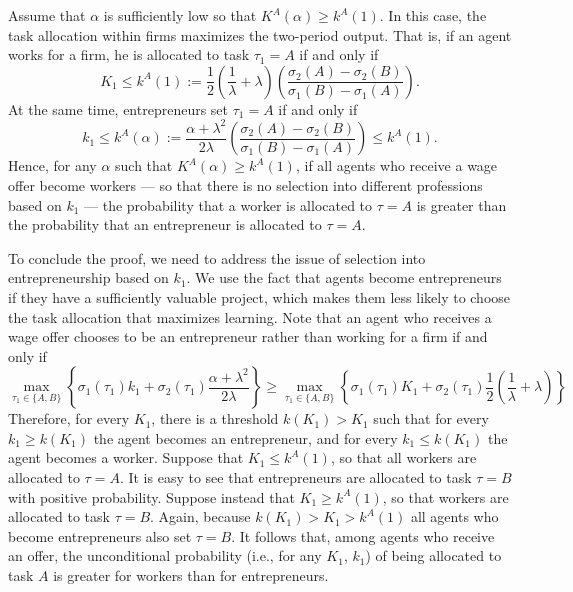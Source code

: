 \documentclass[12pt,american]{paper}
\theoremstyle{remark}
\begin{document}

Assume that $\alpha$ is sufficiently low so that $K^A(\alpha)\geq k^A(1)$. In this case, the task allocation within firms maximizes the two-period output. That is,  if an agent works for a firm, he is allocated to task $\tau_1=A$ if and only if
$$
K_1 \leq k^A(1) := \frac{1}{2} \left(\frac{1}{\lambda}+\lambda\right) \left( \frac{ \sigma_2(A)- \sigma_2(B)}{ \sigma_1(B)- \sigma_1(A)} \right).
$$
At the same time, entrepreneurs set $\tau_1=A$ if and only if
$$
k_{1}\leq k^A(\alpha) := \frac{\alpha + \lambda^2}{2 \lambda}  \left( \frac{ \sigma_2(A)- \sigma_2(B)}{ \sigma_1(B)- \sigma_1(A)} \right)  \leq k^A(1). 
$$ 
Hence, for any  $\alpha$ such that $K^A(\alpha)\geq k^A(1)$, if all agents who receive a wage offer become workers --- so that there is no selection into different professions based on $k_1$ --- the probability that a worker is allocated to $\tau=A$ is greater than the probability that an entrepreneur is allocated to $\tau=A$.

To conclude the proof, we need to address the issue of selection into entrepreneurship based on $k_1$. We use the fact that agents become entrepreneurs if they have a sufficiently valuable project, which makes them less likely to choose the task allocation that maximizes learning. Note that an agent who receives a wage offer chooses to be an entrepreneur rather than working for a firm if and only if
\[
\max_{\tau_1\in\{A,B\}} \left\lbrace  \sigma_1(\tau_1)k_1 +  \sigma_2(\tau_1) \frac{\alpha + \lambda^2}{2\lambda} \right\rbrace \geq \max_{\tau_1\in\{A,B\}} \left\lbrace  \sigma_1(\tau_1)K_1 +  \sigma_2(\tau_1) \frac{1}{2} \left(\frac{1}{\lambda}+\lambda\right) \right\rbrace 
\]
Therefore, for every $K_1$, there is a threshold $k(K_1)>K_1$ such that for every $k_1\geq k(K_1)$ the agent becomes an entrepreneur, and for every $k_1\leq k(K_1)$ the agent becomes a worker. Suppose that $K_1\leq k^A(1) $, so that all workers are allocated to $\tau=A$. It is easy to see that entrepreneurs are allocated to task $\tau=B$ with positive probability. Suppose instead that $K_1\geq k^A(1)  $, so that workers are allocated to task $\tau=B$. Again, because  $k(K_1)>K_1>k^A(1) $ all agents who become entrepreneurs also set $\tau=B$. It follows that, among agents who receive an offer, the unconditional probability (i.e., for any $K_1$, $k_1$) of being allocated to task $A$ is greater for workers than for entrepreneurs.
\end{document}
